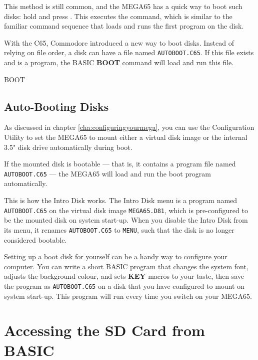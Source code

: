 This method is still common, and the MEGA65 has a quick way to boot such disks: hold  and press . This executes the  command, which is similar to the familiar command sequence that loads and runs the first program on the disk.

With the C65, Commodore introduced a new way to boot disks. Instead of relying on file order, a disk can have a file named {\tt AUTOBOOT.C65}. If this file exists and is a program, the BASIC {\bf BOOT} command will load and run this file.

\begin{screenoutput}
BOOT
\end{screenoutput}

\subsection{Auto-Booting Disks}

As discussed in chapter \vref{cha:configuringyourmega}, you can use the Configuration Utility to set the MEGA65 to mount either a virtual disk image or the internal 3.5" disk drive automatically during boot.

If the mounted disk is bootable --- that is, it contains a program file named {\tt AUTOBOOT.C65} --- the MEGA65 will load and run the boot program automatically.

This is how the Intro Disk works. The Intro Disk menu is a program named {\tt AUTOBOOT.C65} on the virtual disk image {\tt MEGA65.D81}, which is pre-configured to be the mounted disk on system start-up. When you disable the Intro Disk from its menu, it renames {\tt AUTOBOOT.C65} to {\tt MENU}, such that the disk is no longer considered bootable.

Setting up a boot disk for yourself can be a handy way to configure your computer. You can write a short BASIC program that changes the system font, adjusts the background colour, and sets {\bf KEY} macros to your taste, then save the program as {\tt AUTOBOOT.C65} on a disk that you have configured to mount on system start-up. This program will run every time you switch on your MEGA65.


\section{Accessing the SD Card from BASIC}

